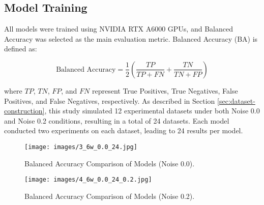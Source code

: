 \documentclass{article}
\begin{document}
\subsection{Model Training}
All models were trained using NVIDIA RTX A6000 GPUs, and Balanced Accuracy was selected as the main evaluation metric. Balanced Accuracy (BA) is defined as:

\begin{equation}
\text{Balanced Accuracy} = \frac{1}{2} \left( \frac{TP}{TP + FN} + \frac{TN}{TN + FP} \right)  
\end{equation}

where $TP$, $TN$, $FP$, and $FN$ represent True Positives, True Negatives, False Positives, and False Negatives, respectively. As described in Section \ref{sec:dataset-construction}, this study simulated 12 experimental datasets under both Noise 0.0 and Noise 0.2 conditions, resulting in a total of 24 datasets. Each model conducted two experiments on each dataset, leading to 24 results per model.






\begin{figure}[ht]
    \centering
    \begin{minipage}{0.45\textwidth}
        \centering
        \texttt{[image: images/3\_6w\_0.0\_24.jpg]}
        \caption{Balanced Accuracy Comparison of Models (Noise 0.0).}
        \label{box0}
    \end{minipage}\hfill
    \begin{minipage}{0.45\textwidth}
        \centering
        \texttt{[image: images/4\_6w\_0.0\_24\_0.2.jpg]}
        \caption{Balanced Accuracy Comparison of Models (Noise 0.2).}
        \label{box0.2}
    \end{minipage}
\end{figure}
\end{document}
